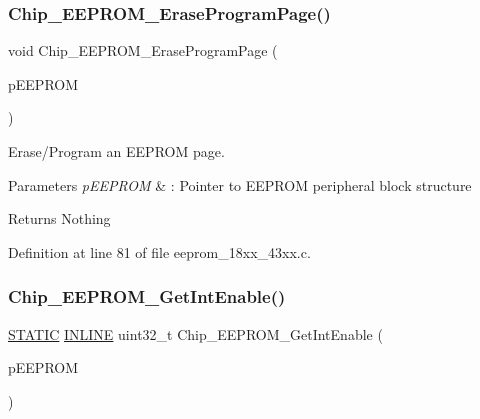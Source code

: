 \subsubsection{\texorpdfstring{Chip\+\_\+\+E\+E\+P\+R\+O\+M\+\_\+\+Erase\+Program\+Page()}{Chip\_EEPROM\_EraseProgramPage()}}
{\footnotesize\ttfamily void Chip\+\_\+\+E\+E\+P\+R\+O\+M\+\_\+\+Erase\+Program\+Page (\begin{DoxyParamCaption}\item[{\hyperlink{struct_l_p_c___e_e_p_r_o_m___t}{L\+P\+C\+\_\+\+E\+E\+P\+R\+O\+M\+\_\+T} $\ast$}]{p\+E\+E\+P\+R\+OM }\end{DoxyParamCaption})}



Erase/\+Program an E\+E\+P\+R\+OM page. 


\begin{DoxyParams}{Parameters}
{\em p\+E\+E\+P\+R\+OM} & \+: Pointer to E\+E\+P\+R\+OM peripheral block structure \\
\hline
\end{DoxyParams}
\begin{DoxyReturn}{Returns}
Nothing 
\end{DoxyReturn}


Definition at line 81 of file eeprom\+\_\+18xx\+\_\+43xx.\+c.

\mbox{\label{group___e_e_p_r_o_m__18_x_x__43_x_x_gabc5dffbf26c343bfccd25bface186de0}} 
\subsubsection{\texorpdfstring{Chip\+\_\+\+E\+E\+P\+R\+O\+M\+\_\+\+Get\+Int\+Enable()}{Chip\_EEPROM\_GetIntEnable()}}
{\footnotesize\ttfamily \hyperlink{group___l_p_c___types___public___macros_ga10b2d890d871e1489bb02b7e70d9bdfb}{S\+T\+A\+T\+IC} \hyperlink{spifi__18xx__43xx_8h_a2eb6f9e0395b47b8d5e3eeae4fe0c116}{I\+N\+L\+I\+NE} uint32\+\_\+t Chip\+\_\+\+E\+E\+P\+R\+O\+M\+\_\+\+Get\+Int\+Enable (\begin{DoxyParamCaption}\item[{\hyperlink{struct_l_p_c___e_e_p_r_o_m___t}{L\+P\+C\+\_\+\+E\+E\+P\+R\+O\+M\+\_\+T} $\ast$}]{p\+E\+E\+P\+R\+OM }\end{DoxyParamCaption})}



